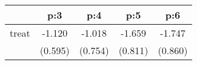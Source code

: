 \begin{tabular}{l*{4}{c}}
\hline\hline
            &\multicolumn{1}{c}{p:3}&\multicolumn{1}{c}{p:4}&\multicolumn{1}{c}{p:5}&\multicolumn{1}{c}{p:6}\\
\hline
treat       &      -1.120&      -1.018&      -1.659&      -1.747\\
            &     (0.595)&     (0.754)&     (0.811)&     (0.860)\\
\hline\hline
\end{tabular}
